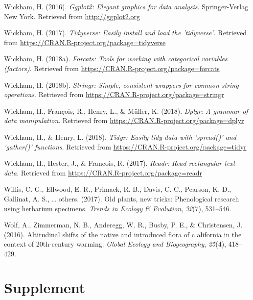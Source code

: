 \documentclass[man,floatsintext]{apa6}
\theoremstyle{definition}
\theoremstyle{definition}
\theoremstyle{definition}
\theoremstyle{remark}
\begin{document}
\leavevmode\hypertarget{ref-R-ggplot2}{}%
Wickham, H. (2016). \emph{Ggplot2: Elegant graphics for data analysis}.
Springer-Verlag New York. Retrieved from \url{http://ggplot2.org}

\leavevmode\hypertarget{ref-R-tidyverse}{}%
Wickham, H. (2017). \emph{Tidyverse: Easily install and load the
'tidyverse'}. Retrieved from
\url{https://CRAN.R-project.org/package=tidyverse}

\leavevmode\hypertarget{ref-R-forcats}{}%
Wickham, H. (2018a). \emph{Forcats: Tools for working with categorical
variables (factors)}. Retrieved from
\url{https://CRAN.R-project.org/package=forcats}

\leavevmode\hypertarget{ref-R-stringr}{}%
Wickham, H. (2018b). \emph{Stringr: Simple, consistent wrappers for
common string operations}. Retrieved from
\url{https://CRAN.R-project.org/package=stringr}

\leavevmode\hypertarget{ref-R-dplyr}{}%
Wickham, H., François, R., Henry, L., \& Müller, K. (2018). \emph{Dplyr:
A grammar of data manipulation}. Retrieved from
\url{https://CRAN.R-project.org/package=dplyr}

\leavevmode\hypertarget{ref-R-tidyr}{}%
Wickham, H., \& Henry, L. (2018). \emph{Tidyr: Easily tidy data with
'spread()' and 'gather()' functions}. Retrieved from
\url{https://CRAN.R-project.org/package=tidyr}

\leavevmode\hypertarget{ref-R-readr}{}%
Wickham, H., Hester, J., \& Francois, R. (2017). \emph{Readr: Read
rectangular text data}. Retrieved from
\url{https://CRAN.R-project.org/package=readr}

\leavevmode\hypertarget{ref-willis2017old}{}%
Willis, C. G., Ellwood, E. R., Primack, R. B., Davis, C. C., Pearson, K.
D., Gallinat, A. S., \ldots{} others. (2017). Old plants, new tricks:
Phenological research using herbarium specimens. \emph{Trends in Ecology
\& Evolution}, \emph{32}(7), 531--546.

\leavevmode\hypertarget{ref-wolf2016altitudinal}{}%
Wolf, A., Zimmerman, N. B., Anderegg, W. R., Busby, P. E., \&
Christensen, J. (2016). Altitudinal shifts of the native and introduced
flora of c alifornia in the context of 20th-century warming.
\emph{Global Ecology and Biogeography}, \emph{25}(4), 418--429.

\endgroup

\newpage
\setcounter{table}{0}  \renewcommand{\thetable}{S\arabic{table}} \setcounter{figure}{0} \renewcommand{\thefigure}{S\arabic{figure}}

\hypertarget{supplement}{%
\section{Supplement}\label{supplement}}
\end{document}
